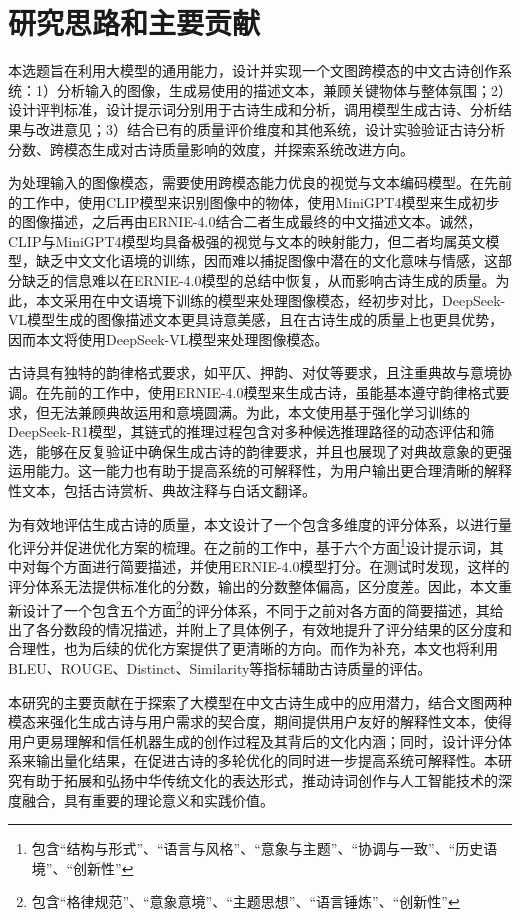 \section{研究思路和主要贡献}

本选题旨在利用大模型的通用能力，设计并实现一个文图跨模态的中文古诗创作系统：1）分析输入的图像，生成易使用的描述文本，兼顾关键物体与整体氛围；2）设计评判标准，设计提示词分别用于古诗生成和分析，调用模型生成古诗、分析结果与改进意见；3）结合已有的质量评价维度和其他系统，设计实验验证古诗分析分数、跨模态生成对古诗质量影响的效度，并探索系统改进方向。

为处理输入的图像模态，需要使用跨模态能力优良的视觉与文本编码模型。在先前的工作中，使用CLIP模型来识别图像中的物体，使用MiniGPT4模型来生成初步的图像描述，之后再由ERNIE-4.0结合二者生成最终的中文描述文本。诚然，CLIP与MiniGPT4模型均具备极强的视觉与文本的映射能力，但二者均属英文模型，缺乏中文文化语境的训练，因而难以捕捉图像中潜在的文化意味与情感，这部分缺乏的信息难以在ERNIE-4.0模型的总结中恢复，从而影响古诗生成的质量。为此，本文采用在中文语境下训练的模型来处理图像模态，经初步对比，DeepSeek-VL模型生成的图像描述文本更具诗意美感，且在古诗生成的质量上也更具优势，因而本文将使用DeepSeek-VL模型来处理图像模态。

古诗具有独特的韵律格式要求，如平仄、押韵、对仗等要求，且注重典故与意境协调。在先前的工作中，使用ERNIE-4.0模型来生成古诗，虽能基本遵守韵律格式要求，但无法兼顾典故运用和意境圆满。为此，本文使用基于强化学习训练的DeepSeek-R1模型，其链式的推理过程包含对多种候选推理路径的动态评估和筛选，能够在反复验证中确保生成古诗的韵律要求，并且也展现了对典故意象的更强运用能力。这一能力也有助于提高系统的可解释性，为用户输出更合理清晰的解释性文本，包括古诗赏析、典故注释与白话文翻译。

为有效地评估生成古诗的质量，本文设计了一个包含多维度的评分体系，以进行量化评分并促进优化方案的梳理。在之前的工作中，基于六个方面\footnote{包含“结构与形式”、“语言与风格”、“意象与主题”、“协调与一致”、“历史语境”、“创新性”}设计提示词，其中对每个方面进行简要描述，并使用ERNIE-4.0模型打分。在测试时发现，这样的评分体系无法提供标准化的分数，输出的分数整体偏高，区分度差。因此，本文重新设计了一个包含五个方面\footnote{包含“格律规范”、“意象意境”、“主题思想”、“语言锤炼”、“创新性”}的评分体系，不同于之前对各方面的简要描述，其给出了各分数段的情况描述，并附上了具体例子，有效地提升了评分结果的区分度和合理性，也为后续的优化方案提供了更清晰的方向。而作为补充，本文也将利用BLEU、ROUGE、Distinct、Similarity等指标辅助古诗质量的评估。

本研究的主要贡献在于探索了大模型在中文古诗生成中的应用潜力，结合文图两种模态来强化生成古诗与用户需求的契合度，期间提供用户友好的解释性文本，使得用户更易理解和信任机器生成的创作过程及其背后的文化内涵；同时，设计评分体系来输出量化结果，在促进古诗的多轮优化的同时进一步提高系统可解释性。本研究有助于拓展和弘扬中华传统文化的表达形式，推动诗词创作与人工智能技术的深度融合，具有重要的理论意义和实践价值。

